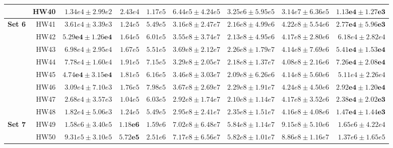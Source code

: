 \documentclass[pdflatex]{sn-jnl}
\begin{document}
\begin{table}
\begin{tabular}{l|r|r|r|r|r|r|r|r}
& HW40 & $1.34e4 \pm 2.99e2$ & $2.43e4$ & $1.17e5$
& $6.44e5 \pm 4.24e5$
& $3.25e6 \pm 5.95e5$
& $3.14e7 \pm 6.36e5$
& $\mathbf{1.13e4 \pm 1.27e3}$ \\
\hline

\multirow{8}{*}{\textbf{Set 6}}
& HW41 & $3.61e4 \pm 3.39e3$ & $1.24e5$ & $5.49e5$
& $3.16e8 \pm 2.47e7$
& $2.16e8 \pm 4.99e6$
& $4.22e8 \pm 5.54e6$
& $\mathbf{2.77e4 \pm 5.96e3}$ \\

& HW42 & $\mathbf{5.29e4 \pm 1.26e4}$ & $1.64e5$ & $6.01e5$
& $3.55e8 \pm 3.74e7$
& $2.13e8 \pm 4.95e6$
& $4.17e8 \pm 2.80e6$
& $6.18e4 \pm 2.82e4$ \\

& HW43 & $6.98e4 \pm 2.95e4$ & $1.67e5$ & $5.51e5$
& $3.69e8 \pm 2.12e7$
& $2.26e8 \pm 1.79e7$
& $4.14e8 \pm 7.69e6$
& $\mathbf{5.41e4 \pm 1.53e4}$ \\

& HW44 & $7.78e4 \pm 1.60e4$ & $1.91e5$ & $7.15e5$
& $3.29e8 \pm 2.05e7$
& $2.18e8 \pm 1.37e7$
& $4.08e8 \pm 2.16e6$
& $\mathbf{7.26e4 \pm 2.08e4}$ \\

& HW45 & $\mathbf{4.74e4 \pm 3.15e4}$ & $1.81e5$ & $6.16e5$
& $3.46e8 \pm 3.03e7$
& $2.09e8 \pm 6.26e6$
& $4.14e8 \pm 5.60e6$
& $5.11e4 \pm 2.26e4$ \\

& HW46 & $3.09e4 \pm 7.10e3$ & $1.76e5$ & $7.98e5$
& $3.67e8 \pm 2.69e7$
& $2.29e8 \pm 1.91e7$
& $4.24e8 \pm 4.50e6$
& $\mathbf{2.92e4 \pm 1.20e4}$ \\

& HW47 & $2.68e4 \pm 3.57e3$ & $1.04e5$ & $6.03e5$
& $2.92e8 \pm 1.74e7$
& $2.10e8 \pm 1.14e7$
& $4.17e8 \pm 3.52e6$
& $\mathbf{2.38e4 \pm 2.02e3}$ \\

& HW48 & $1.82e4 \pm 5.06e3$ & $1.24e5$ & $5.49e5$
& $2.95e8 \pm 2.41e7$
& $2.35e8 \pm 1.51e7$
& $4.16e8 \pm 4.08e6$
& $\mathbf{1.47e4 \pm 1.44e3}$ \\
\hline

\multirow{8}{*}{\textbf{Set 7}}
& HW49 & $1.58e6 \pm 3.40e5$ & $\mathbf{1.18e6}$ & $1.59e6$
& $7.02e8 \pm 6.48e7$
& $5.84e8 \pm 1.14e7$
& $9.15e8 \pm 5.10e6$
& $1.65e6 \pm 4.22e4$ \\

& HW50 & $9.31e5 \pm 3.10e5$ & $\mathbf{5.72e5}$ & $2.51e6$
& $7.17e8 \pm 6.56e7$
& $5.82e8 \pm 1.01e7$
& $8.86e8 \pm 1.16e7$
& $1.37e6 \pm 1.65e5$ \\


\end{tabular}
\end{table}
\end{document}
